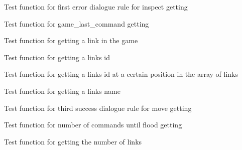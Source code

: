 \begin{DoxyRefList}
%
Test function for first error dialogue rule for inspect getting  
\item[Global \mbox{\hyperlink{game__test_8c_af6e23cdd520e12700beb67f7b2f28d5e}{test3\+\_\+game\+\_\+get\+\_\+last\+\_\+command\+\_\+cmd}} ()]\label{test__test000271}%
%
Test function for game\+\_\+last\+\_\+command getting  
\item[Global \mbox{\hyperlink{game__test_8c_a16d042e1fef87636cd0832adc1ef86db}{test3\+\_\+game\+\_\+get\+\_\+link}} ()]\label{test__test000232}%
%
Test function for getting a link in the game  
\item[Global \mbox{\hyperlink{game__test_8c_a0a7240e28825657dcdfc57326071e3eb}{test3\+\_\+game\+\_\+get\+\_\+link\+\_\+id}} ()]\label{test__test000235}%
%
Test function for getting a link\textquotesingle{}s id  
\item[Global \mbox{\hyperlink{game__test_8c_a62f126b2534666702f5dacb3136cccb0}{test3\+\_\+game\+\_\+get\+\_\+link\+\_\+id\+\_\+at}} ()]\label{test__test000238}%
%
Test function for getting a link\textquotesingle{}s id at a certain position in the array of links  
\item[Global \mbox{\hyperlink{game__test_8c_aa93200d1a332eb46df39c1bd135bcef3}{test3\+\_\+game\+\_\+get\+\_\+link\+\_\+name}} ()]\label{test__test000241}%
%
Test function for getting a link\textquotesingle{}s name\textquotesingle{}  
\item[Global \mbox{\hyperlink{game__test_8c_a3a0f9ed4525fb19cedff10516a615e3e}{test3\+\_\+game\+\_\+get\+\_\+move\+\_\+dialogue\+\_\+rule}} ()]\label{test__test000326}%
%
Test function for third success dialogue rule for move getting  
\item[Global \mbox{\hyperlink{game__test_8c_a5a24aa2c17663a385f15eb84bb12f0ac}{test3\+\_\+game\+\_\+get\+\_\+num\+\_\+commands\+\_\+till\+\_\+flood}} ()]\label{test__test000398}%
%
Test function for number of commands until flood getting  
\item[Global \mbox{\hyperlink{game__test_8c_a104e15092896682a546ad731fed0e35f}{test3\+\_\+game\+\_\+get\+\_\+num\+\_\+links}} ()]\label{test__test000266}%
%
Test function for getting the number of links  
\item[Global \mbox{\hyperlink{game__test_8c_ab8fb2418835027cbc3f77d9af8039259}{test3\+\_\+game\+\_\+get\+\_\+num\+\_\+objects}} ()]\label{test__test000197}%

\end{DoxyRefList}
